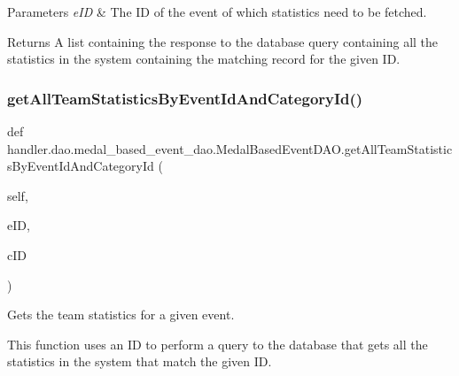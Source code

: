 \begin{DoxyParams}{Parameters}
{\em e\+ID} & The ID of the event of which statistics need to be fetched.\\
\hline
\end{DoxyParams}
\begin{DoxyReturn}{Returns}
A list containing the response to the database query containing all the statistics in the system containing the matching record for the given ID. 
\end{DoxyReturn}
\mbox{\label{classhandler_1_1dao_1_1medal__based__event__dao_1_1_medal_based_event_d_a_o_a76a755e1f46f2109d7cfec243bd7f8d8}} 
\subsubsection{\texorpdfstring{get\+All\+Team\+Statistics\+By\+Event\+Id\+And\+Category\+Id()}{getAllTeamStatisticsByEventIdAndCategoryId()}}
{\footnotesize\ttfamily def handler.\+dao.\+medal\+\_\+based\+\_\+event\+\_\+dao.\+Medal\+Based\+Event\+D\+A\+O.\+get\+All\+Team\+Statistics\+By\+Event\+Id\+And\+Category\+Id (\begin{DoxyParamCaption}\item[{}]{self,  }\item[{}]{e\+ID,  }\item[{}]{c\+ID }\end{DoxyParamCaption})}



Gets the team statistics for a given event. 

This function uses an ID to perform a query to the database that gets all the statistics in the system that match the given ID.


